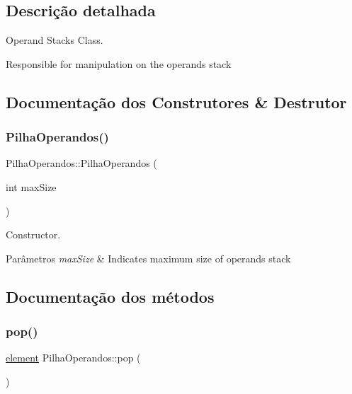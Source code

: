 \subsection{Descrição detalhada}
Operand Stack\textquotesingle{}s Class. 

Responsible for manipulation on the operands stack 

\subsection{Documentação dos Construtores \& Destrutor}
\mbox{\label{classPilhaOperandos_ab17dc4822af4e7e7c0962152d93547c6}} 
\subsubsection{\texorpdfstring{Pilha\+Operandos()}{PilhaOperandos()}}
{\footnotesize\ttfamily Pilha\+Operandos\+::\+Pilha\+Operandos (\begin{DoxyParamCaption}\item[{int}]{max\+Size }\end{DoxyParamCaption})}



Constructor. 


\begin{DoxyParams}{Parâmetros}
{\em max\+Size} & Indicates maximum size of operands stack \\
\hline
\end{DoxyParams}


\subsection{Documentação dos métodos}
\mbox{\label{classPilhaOperandos_a17a3e3f5e3caad834db7653b2c17ef24}} 
\subsubsection{\texorpdfstring{pop()}{pop()}}
{\footnotesize\ttfamily \hyperlink{unionelement__u}{element} Pilha\+Operandos\+::pop (\begin{DoxyParamCaption}{ }\end{DoxyParamCaption})}



